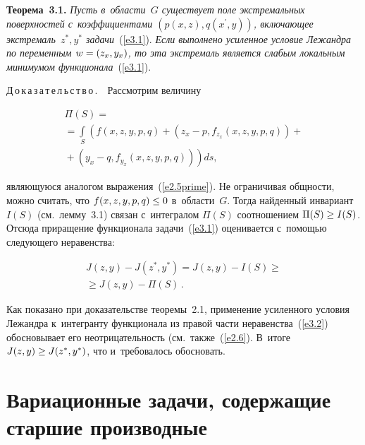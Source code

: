 \begin{multicols}{2}
     \smallskip
     
     \noindent
     \textbf{Теорема~3.1.} \textit{Пусть в~области~$G$ существует поле 
экстремальных поверхностей с~коэффициентами $(p(x,z), q(x^\prime,y))$, включающее 
экстремаль~$z^*, y^*$ задачи}~(\ref{e3.1}). \textit{Если выполнено усиленное 
условие Ле\-жанд\-ра по переменным $w\hm= (z_x, y_x)$, то эта экстремаль является 
слабым локальным минимумом функционала}~(\ref{e3.1}). 
    
    \smallskip
    
    \noindent
    Д\,о\,к\,а\,з\,а\,т\,е\,л\,ь\,с\,т\,в\,о\,.\ \  Рассмотрим величину
    
    \vspace*{-2pt}
    
    \noindent
 \begin{multline*}
 \Pi(S)= {}\\
 {}=\int\limits_S \left(f(x,z,y,p,q)+\left( z_x-p, f_{z_x}\left(x,z,y,p,q\right)\right)+{}\right.\\
\left. {}+ \left( y_x-q, f_{y_x}(x,z,y,p,q)\right)\right)ds,
 \end{multline*}

\vspace*{-2pt}


\noindent
являющуюся аналогом выражения~(\ref{e2.5prime}). Не ограничивая общности, 
можно считать, что $f(x,z,y,p,q)\hm\leq 0$ в~области~$G$. Тогда найденный 
инвариант $I(S)$ (см.\ лемму~3.1) связан с~интегралом $\Pi(S)$ соотношением 
$\Pi(S)\hm\geq I(S)$. Отсюда приращение функционала задачи~(\ref{e3.1}) 
оценивается с~помощью следующего неравенства:

\vspace*{-2pt}

\noindent
\begin{multline}
J(z,y)-J(z^*, y^*) = J(z,y)-I(S)\geq{}\\
{}\geq J(z,y)-\Pi(S)\,.
\label{e3.2}
\end{multline}

\vspace*{-2pt}

\noindent
Как показано при доказательстве теоремы~2.1, применение усиленного условия 
Лежандра к~интегранту функционала из правой части неравенства~(\ref{e3.2}) 
обосновывает его неотрицательность (см.\ также~(\ref{e2.6}). В~итоге $J(z,y)\hm\geq 
J(z^*, y^*)$, что и~требовалось обосно\-вать.

\section{Вариационные задачи, содержащие старшие производные}


\end{multicols}
